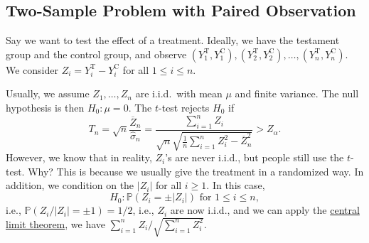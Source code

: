 \subsection{Two-Sample Problem with Paired Observation}
Say we want to test the effect of a treatment. Ideally, we have the testament group and the control group, and observe \((Y_1^{\text{T} }, Y_1^{\text{C} }), (Y_2^{\text{T} }, Y_2^{\text{C} }), \dots , (Y_n^{\text{T} }, Y_n^{\text{C} })\). We consider \(Z_i = Y_i^{\text{T} } - Y_i^{\text{C} }\) for all \(1 \leq i \leq n\).

Usually, we assume \(Z_1 , \dots , Z_n\) are i.i.d.\ with mean \(\mu \) and finite variance. The null hypothesis is then \(H_0 \colon \mu = 0\). The \(t\)-test rejects \(H_0\) if
\[
	T_n
	= \sqrt{n} \frac{\overline{Z} _n}{\hat{\sigma} _n}
	= \frac{\sum_{i=1}^{n} Z_i}{\sqrt{n} \sqrt{\frac{1}{n} \sum_{i=1}^{n} Z_i^2 - \overline{Z} _n^2} }
	> Z_{\alpha }.
\]
However, we know that in reality, \(Z_i\)'s are never i.i.d., but people still use the \(t\)-test. Why? This is because we usually give the treatment in a randomized way. In addition, we condition on the \(\vert Z_i \vert \) for all \(i \geq 1\). In this case,
\[
	H_0 \colon \mathbb{P} (Z_i = \pm \vert Z_i \vert ) \text{ for }  1 \leq i \leq n,
\]
i.e., \(\mathbb{P} (Z_i / \vert Z_i \vert = \pm 1) = 1 / 2\), i.e., \(Z_i\) are now i.i.d., and we can apply the \hyperref[thm:CLT]{central limit theorem}, we have \(\sum_{i=1}^{n} Z_i / \sqrt{\sum_{i=1}^{n} Z_i^2} \).